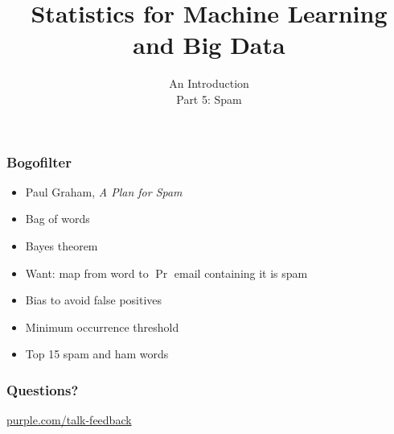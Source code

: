 

\title
{Statistics for Machine Learning and Big Data}
\subtitle{An Introduction\\[6mm] Part 5: Spam}




\begin{frame}
  \titlepage
\end{frame}


\begin{frame}
  \frametitle{Bogofilter}

   {
    \begin{itemize}
    \item Paul Graham, \textit{A Plan for Spam}
    \item Bag of words
    \item Bayes theorem
    \end{itemize}

  }
   {
    \begin{itemize}
    \item Want: map from word to $\Pr$ email containing it is spam
    \item Bias to avoid false positives
    \item Minimum occurrence threshold
    \item Top 15 spam and ham words
    \end{itemize}
  }

\end{frame}


\begin{frame}
  \frametitle{Questions?}
  \vspace{3cm}
  \centerline{\large\url{purple.com/talk-feedback}}
\end{frame}


